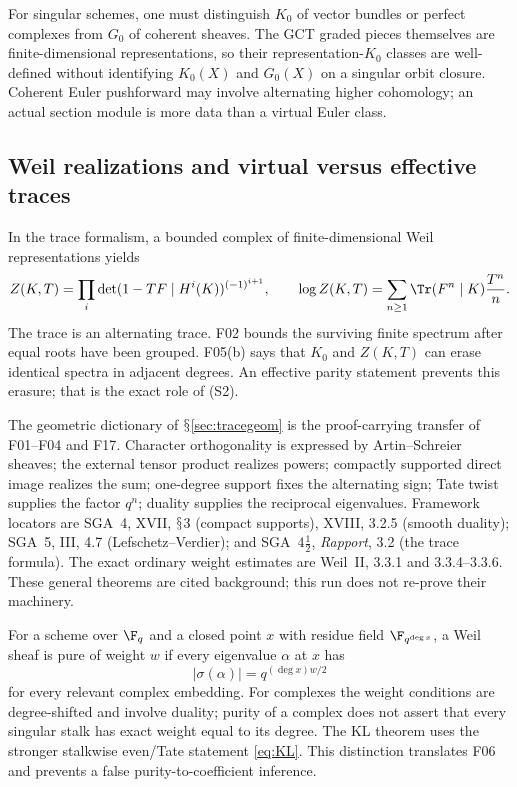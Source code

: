 \documentclass[11pt,a4paper]{article}
\renewcommand{\S}{\ensuremath{\mathsection}}
\newcommand{\fid}[1]{\textsf{#1}}\newcommand{\gate}[1]{\textsf{#1}}
\theoremstyle{named}\newtheorem{finding}{Finding}[section]
\theoremstyle{definition}\newtheorem{definition}[finding]{Definition}
\theoremstyle{remark}\newtheorem{remark}[finding]{Remark}
\begin{document}
For singular schemes, one must distinguish $K_0$ of vector bundles or perfect complexes from $G_0$ of coherent sheaves. The GCT graded pieces themselves are finite-dimensional representations, so their representation-$K_0$ classes are well-defined without identifying $K_0(X)$ and $G_0(X)$ on a singular orbit closure. Coherent Euler pushforward may involve alternating higher cohomology; an actual section module is more data than a virtual Euler class.

\subsection{Weil realizations and virtual versus effective traces}
In the trace formalism, a bounded complex of finite-dimensional Weil representations yields
\[
 Z(K,T)=\prod_i\det(1-TF\mid H^i(K))^{(-1)^{i+1}},\qquad
 \log Z(K,T)=\sum_{n\ge1}\Tr(F^n\mid K)\frac{T^n}{n}.
\]
The trace is an alternating trace. \fid{F02} bounds the surviving finite spectrum after equal roots have been grouped. \fid{F05}(b) says that $K_0$ and $Z(K,T)$ can erase identical spectra in adjacent degrees. An effective parity statement prevents this erasure; that is the exact role of (S2).

The geometric dictionary of \S\ref{sec:tracegeom} is the proof-carrying transfer of \fid{F01}--\fid{F04} and \fid{F17}. Character orthogonality is expressed by Artin--Schreier sheaves; the external tensor product realizes powers; compactly supported direct image realizes the sum; one-degree support fixes the alternating sign; Tate twist supplies the factor $q^n$; duality supplies the reciprocal eigenvalues. Framework locators are SGA~4, XVII, \S3 (compact supports), XVIII, 3.2.5 (smooth duality); SGA~5, III, 4.7 (Lefschetz--Verdier); and SGA~$4\frac12$, \emph{Rapport}, 3.2 (the trace formula). The exact ordinary weight estimates are Weil~II, 3.3.1 and 3.3.4--3.3.6. These general theorems are cited background; this run does not re-prove their machinery.

For a scheme over $\F_q$ and a closed point $x$ with residue field $\F_{q^{\deg x}}$, a Weil sheaf is pure of weight $w$ if every eigenvalue $\alpha$ at $x$ has
\[
 |\sigma(\alpha)|=q^{(\deg x)w/2}
\]
for every relevant complex embedding. For complexes the weight conditions are degree-shifted and involve duality; purity of a complex does not assert that every singular stalk has exact weight equal to its degree. The KL theorem uses the stronger stalkwise even/Tate statement \eqref{eq:KL}. This distinction translates \fid{F06} and prevents a false purity-to-coefficient inference.
\end{document}

